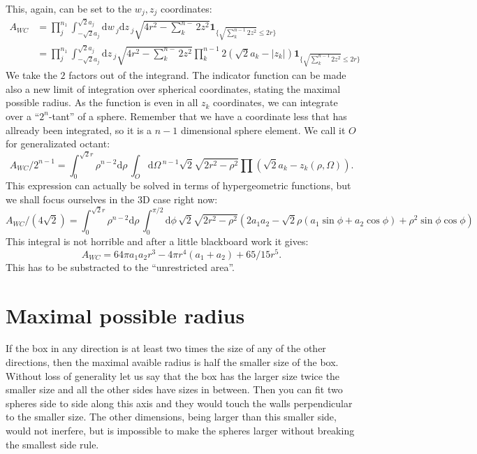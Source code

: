 \documentclass[superscriptaddress,pre,reprint,showpacs,onecolumn]{revtex4-1}
\newcommand{\rd}[1]{\mathrm{d}{#1} \,}
\newcommand{\indicatorsymbol}{\mathbf{1}}
\newcommand{\indicator}[1]{\indicatorsymbol_{ \{   #1 \} } }
\begin{document}
  This, again, can be set to the $w_j, z_j$ coordinates:
  \begin{equation}
    \begin{split}
      A_{WC}& =  \prod_j^{n_1} \int_{-\sqrt{2}a_j}^{\sqrt{2}a_j} \rd w_j \rd z_j
      \sqrt{4 r^2 - \sum_k^{n-} 2 z^2}  
        \indicator{\sqrt{\sum_k^{n-1} 2 z^2} \leq 2 r}\\ 
        & =  \prod_j^{n_1} \int_{-\sqrt{2}a_j}^{\sqrt{2}a_j}  \rd z_j
        \sqrt{4 r^2 - \sum_k^{n-} 2 z^2} \prod_k^{n-1} 2 ( \sqrt{2}a_k - |z_k| ) 
        \indicator{\sqrt{\sum_k^{n-1} 2 z^2} \leq 2 r}
    \end{split}
  \end{equation}
  We take the $2$ factors out of the integrand.
  The indicator function can be made also a new limit of integration over
  spherical coordinates, stating the maximal possible radius. As the function
  is even in all $z_k$ coordinates, we can integrate over a ``$2^n$-tant'' of a sphere.
  Remember that we have a coordinate less that has allready been integrated, so
  it is a $n-1$ dimensional sphere element. We call it $O$ for generalizated octant:
  \begin{equation}
    A_{WC}/2^{n-1}=\int_0^{\sqrt{2}r} \rho^{n-2} \rd \rho \int_O \rd \Omega^{n-1}
    \sqrt{2}\sqrt{2 r^2 - \rho^2} \prod (\sqrt{2}a_k - z_k(\rho, \Omega)).
  \end{equation}
  This expression can actually be solved in terms of hypergeometric functions,
  but we shall focus ourselves in the 3D case right now:
  \begin{equation}
    A_{WC}/(4\sqrt{2})=\int_0^{\sqrt{2}r} \rho^{n-2} \rd \rho \int_0^{\pi/2} \rd \phi
    \sqrt{2}\sqrt{2 r^2 - \rho^2} (2 a_1 a_2 -\sqrt{2} \rho (a_1 \sin \phi+ a_2 \cos\phi)
    +\rho^2 \sin\phi \cos\phi)
  \end{equation}
  This integral is not horrible and after a little blackboard work it gives:
  \begin{equation}
    A_{WC}= 64 \pi a_1 a_2 r^3 - 4\pi r^4 (a_1 +a_2) + 65/15 r^5.
  \end{equation}
  This has to be substracted to the ``unrestricted area''.


\section{Maximal possible radius}

If the box in any direction is at least two times the size of any of
the other directions, then the maximal avaible radius is half the smaller
size of the box. Without loss of generality let us say that the box has
the larger size twice the smaller size and all the other sides have
sizes in between. Then you can fit two spheres side to side along this
axis and they would touch the walls perpendicular to the smaller size.
The other dimensions, being larger than this smaller side, would not
inerfere, but is impossible to make the spheres larger without
breaking the smallest side rule.
\end{document}
